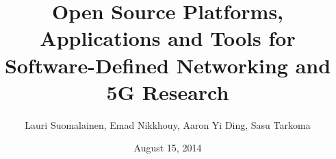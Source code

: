 \documentclass[english]{tktltiki2}
\title{Open Source Platforms, Applications and Tools for Software-Defined Networking and 5G Research}
\author{Lauri Suomalainen, Emad Nikkhouy, Aaron Yi Ding, Sasu Tarkoma}
\date{August 15, 2014}
\theoremstyle{definition}
\theoremstyle{remark}
\begin{document}
\frontmatter      %
\maketitle        %
\makeabstract     %
\tableofcontents  %

\mainmatter       %












% 



 
\end{document}
